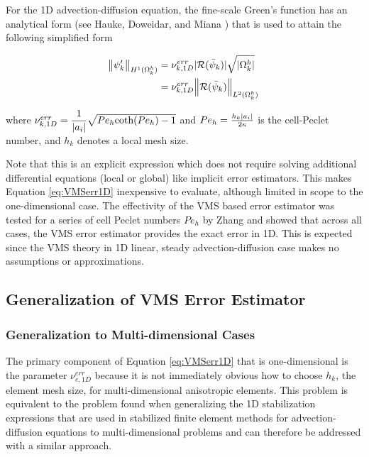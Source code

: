 For the 1D advection-diffusion equation, the fine-scale Green's function has an analytical form (see Hauke, Doweidar, and Miana \cite{hauke2006proper}) that is used to attain the following simplified form

\begin{align}
      \norm{\psi_k'}_{H^1(\Omega^h_k)} &= \nu^{err}_{k,1D} |\mathcal{R}(\bar{\psi}_k)| \sqrt{|\Omega^h_k|} \\
            &= \nu^{err}_{k,1D} \norm{\mathcal{R}(\bar{\psi}_k)}_{L^2(\Omega^h_k)}
      \label{eq:VMSerr1D}
\end{align}

\noindent where $\nu^{err}_{k,1D} = \dfrac{1}{|a_i|} \sqrt{Pe_h \text{coth}({Pe_h})-1}$ and $Pe_h = \frac{h_k |a_i|}{2\kappa}$ is the cell-Peclet number, and $h_k$ denotes a local mesh size.

Note that this is an explicit expression which does not require solving additional differential equations (local or global) like implicit error estimators.
This makes Equation \ref{eq:VMSerr1D} inexpensive to evaluate, although limited in scope to the one-dimensional case. The effectivity of the VMS based error estimator was tested for a series of cell Peclet numbers $Pe_h$ by Zhang \cite{zhang19} and showed that across all cases, the VMS error estimator provides the exact error in 1D. 
This is expected since the VMS theory in 1D linear, steady advection-diffusion case makes no assumptions or approximations.

\subsection{Generalization of VMS Error Estimator}

\subsubsection{Generalization to Multi-dimensional Cases}

The primary component of Equation \ref{eq:VMSerr1D} that is one-dimensional is the parameter $\nu^{err}_{e,1D}$ because it is not immediately obvious how to choose $h_k$, the element mesh size, for multi-dimensional anisotropic elements.
This problem is equivalent to the problem found when generalizing the 1D stabilization expressions that are used in stabilized finite element methods for advection-diffusion equations to multi-dimensional problems \cite{hughes1986newiii} and can therefore be addressed with a similar approach.

